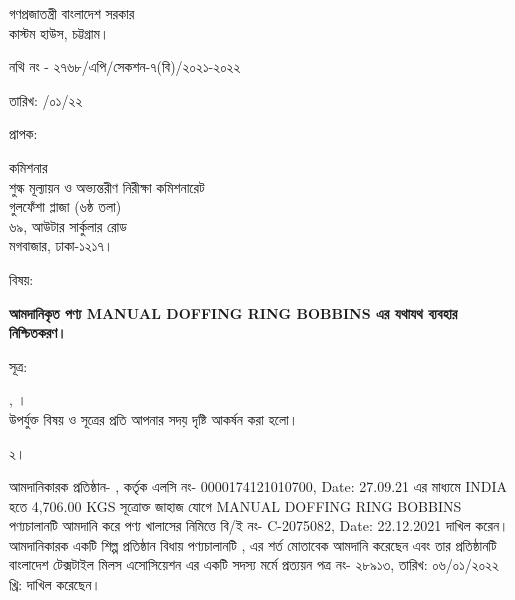 \documentclass[12pt]{article}
\let\oldhref\href
\renewcommand{\href}[3][blue]{\oldhref{#2}{\color{#1}{#3}}}
\newcommand{\fileno}{নথি নং - ২৭৬৮/এপি/সেকশন-৭(বি)/২০২১-২০২২}
\newcommand{\beno}{C-2075082}
\newcommand{\bedt}{22.12.2021}
\newcommand{\lcno}{0000174121010700}
\newcommand{\lcdt}{27.09.21}
\newcommand{\good}{MANUAL DOFFING RING BOBBINS}
\newcommand{\pkg}{4,706.00 KGS}
\newcommand{\co}{INDIA}
\newcommand{\impn}{\scml}
\newcommand{\impadd}{\scmla}
\newcommand{\btmaltno}{প্রত্যয়ন পত্র নং- ২৮৯১৩}
\newcommand{\btmaltnodt}{তারিখ: ০৬/০১/২০২২ খ্রি:}
\newcommand{\fdt}{\hspace*{3em} তারিখ: \hspace{2.4em} /০১/২২}
\begin{document}
\newpage
\begin{center}
\vspace*{6MM}
গণপ্রজাতন্ত্রী বাংলাদেশ সরকার
\\
\footnotesize{কাস্টম হাউস, চট্টগ্রাম।}
\\
\href{}{web: www.chc.gov.bd}\hspace{1em}
\href{}{email: customhousectg@gmail.com}
\end{center}
\begin{minipage}[t]{.70\linewidth}
{\fileno}
\end{minipage}
\begin{minipage}[t]{.30\linewidth}
{\fdt}
\\
\end{minipage}
\begin{minipage}[t]{.07\linewidth}
প্রাপক:
\end{minipage}
\begin{minipage}[t]{.93\linewidth}
কমিশনার
\\
শুল্ক মূল্যায়ন ও অভ্যন্তরীণ নিরীক্ষা কমিশনারেট
\\
গুলফেঁশা প্লাজা (৬ষ্ঠ তলা)
\\
৬৯, আউটার সার্কুলার রোড
\\
মগবাজার, ঢাকা-১২১৭।
\\
\end{minipage}
\begin{minipage}[t]{.07\linewidth}
বিষয়:
\end{minipage}
\begin{minipage}[t]{.93\linewidth}
\textbf{আমদানিকৃত পণ্য {\good} এর যথাযথ ব্যবহার নিশ্চিতকরণ।}
\end{minipage}
\begin{minipage}[t]{.07\linewidth}
সূত্র:
\end{minipage}
\begin{minipage}[t]{.93\linewidth}
{\srootz}, {\srootzd}।
\\
উপর্যুক্ত বিষয় ও সূত্রের প্রতি আপনার সদয় দৃষ্টি
আকর্ষন করা হলো।
\\
\end{minipage}
\begin{minipage}[t]{.07\linewidth}
২।
\end{minipage}
\begin{minipage}[t]{.93\linewidth}
আমদানিকারক প্রতিষ্ঠান- {\impn}, {\impadd}
কর্তৃক এলসি নং- {\lcno}, Date: {\lcdt}
এর মাধ্যমে {\co} হতে
{\pkg} সূত্রোক্ত জাহাজ যোগে {\good}
পণ্যচালানটি আমদানি করে পণ্য
খালাসের নিমিত্তে বি/ই নং- {\beno}, Date: {\bedt}
দাখিল করেন। আমদানিকারক একটি
শিল্প প্রতিষ্ঠান বিধায় পণ্যচালানটি
{\srootz}, {\srootzd}
এর শর্ত মোতাবেক আমদানি করেছেন এবং
তার প্রতিষ্ঠানটি বাংলাদেশ টেক্সটাইল মিলস
এসোসিয়েশন এর একটি সদস্য মর্মে
{\btmaltno},
{\btmaltnodt}
দাখিল করেছেন।
\\
\end{minipage}
\end{document}
